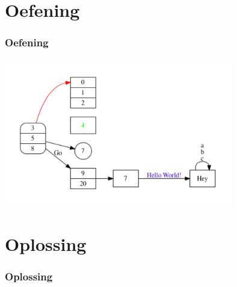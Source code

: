 \section{Oefening}
\begin{frame}
	\frametitle{Oefening}
	\includegraphics[width=10cm]{res/Dot_Oef}
\end{frame}

\section{Oplossing}
\begin{frame}
	\frametitle{Oplossing}
	\lstVII
\end{frame}